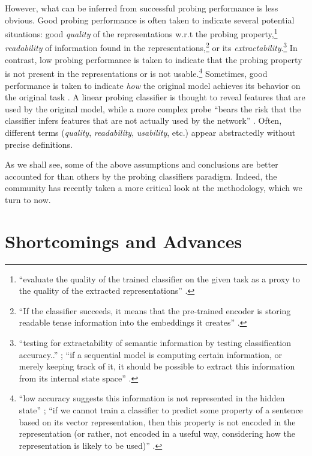 \documentclass[discussion]{clv3}
\begin{document}
However, what can be inferred from successful probing performance is less obvious. 
Good probing performance is often taken to indicate several potential situations: 
good  \emph{quality} of the representations w.r.t the probing property,\footnote{``evaluate the quality of the trained classifier on the given task as a proxy to the quality of the extracted representations'' \cite{belinkov-etal-2017-neural}.}
\emph{readability} of information found in the representations,\footnote{``If the classifier succeeds, it means that the pre-trained encoder is storing readable tense information into the embeddings it creates'' \cite{conneau-etal-2018-cram}.}   
or its \emph{extractability}.\footnote{``testing for extractability of semantic information by testing classification accuracy..'' \cite{ettinger-etal-2016-probing}; ``if a sequential model is computing certain information, or merely keeping track of it, it should be possible to extract this information from its internal state space'' \cite{hupkes2018visualisation}.}
In contrast, low probing performance is taken to indicate that the probing property is not present in the representations or is not usable.\footnote{``low accuracy suggests this information is not represented in the hidden state'' \cite{hupkes2018visualisation}; ``if we cannot train a classifier to predict some property of a sentence based on its vector representation, then this property is not encoded in the representation (or rather, not encoded in a useful way, considering how the representation is likely to be used)'' \cite{adi:2017:ICLR}.} 
%
Sometimes, good  performance is taken to indicate \emph{how} the original model achieves its behavior on the original task \cite{hupkes2018visualisation}. A linear probing classifier is thought to reveal features that are used by the original model, while a more complex probe ``bears the risk that the classifier infers features that are not actually used by the network'' \cite{hupkes2018visualisation}.  
Often, different terms (\emph{quality}, \emph{readability}, \emph{usability}, etc.) appear abstractedly without precise definitions. 


As we shall see, some of the above assumptions and conclusions are better accounted for than others by the probing classifiers paradigm. 
Indeed, the community has recently taken a more critical look at the methodology, which we turn to now.


\section{Shortcomings and Advances} \label{sec:shortcomings-advances} 
\end{document}
